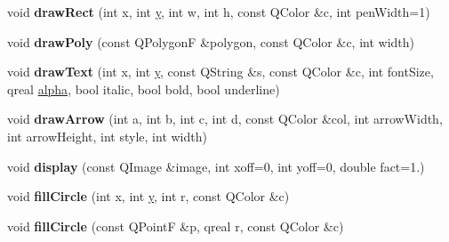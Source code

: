 \begin{DoxyCompactItemize}
\item 
\hypertarget{class_d_o_1_1_painting_window_a0d31c2cf884bc801e677704a452fc092}{void {\bfseries draw\-Rect} (int x, int \hyperlink{group___channel_accessors_gac90c52c5b3a7b2a7e3761e6e84f25778}{y}, int w, int h, const Q\-Color \&c, int pen\-Width=1)}\label{class_d_o_1_1_painting_window_a0d31c2cf884bc801e677704a452fc092}

\item 
\hypertarget{class_d_o_1_1_painting_window_afa8643e3c75e788691af0971bbd78e04}{void {\bfseries draw\-Poly} (const Q\-Polygon\-F \&polygon, const Q\-Color \&c, int width)}\label{class_d_o_1_1_painting_window_afa8643e3c75e788691af0971bbd78e04}

\item 
\hypertarget{class_d_o_1_1_painting_window_a2d5d8b58859dce67f4d217ebb872a6ee}{void {\bfseries draw\-Text} (int x, int \hyperlink{group___channel_accessors_gac90c52c5b3a7b2a7e3761e6e84f25778}{y}, const Q\-String \&s, const Q\-Color \&c, int font\-Size, qreal \hyperlink{group___channel_accessors_gaa131549883a0aae99914ffe78da0dbcb}{alpha}, bool italic, bool bold, bool underline)}\label{class_d_o_1_1_painting_window_a2d5d8b58859dce67f4d217ebb872a6ee}

\item 
\hypertarget{class_d_o_1_1_painting_window_ab26208f9358949835cd0c2903a20010c}{void {\bfseries draw\-Arrow} (int a, int b, int c, int d, const Q\-Color \&col, int arrow\-Width, int arrow\-Height, int style, int width)}\label{class_d_o_1_1_painting_window_ab26208f9358949835cd0c2903a20010c}

\item 
\hypertarget{class_d_o_1_1_painting_window_a8a2b0d9ee239a064684d767e392f54f8}{void {\bfseries display} (const Q\-Image \&image, int xoff=0, int yoff=0, double fact=1.)}\label{class_d_o_1_1_painting_window_a8a2b0d9ee239a064684d767e392f54f8}

\item 
\hypertarget{class_d_o_1_1_painting_window_a8a255a3cbc57a58081502343b981e011}{void {\bfseries fill\-Circle} (int x, int \hyperlink{group___channel_accessors_gac90c52c5b3a7b2a7e3761e6e84f25778}{y}, int r, const Q\-Color \&c)}\label{class_d_o_1_1_painting_window_a8a255a3cbc57a58081502343b981e011}

\item 
\hypertarget{class_d_o_1_1_painting_window_af23f5a16098bd15457909bfad4cb6da0}{void {\bfseries fill\-Circle} (const Q\-Point\-F \&p, qreal r, const Q\-Color \&c)}\label{class_d_o_1_1_painting_window_af23f5a16098bd15457909bfad4cb6da0}


\end{DoxyCompactItemize}

